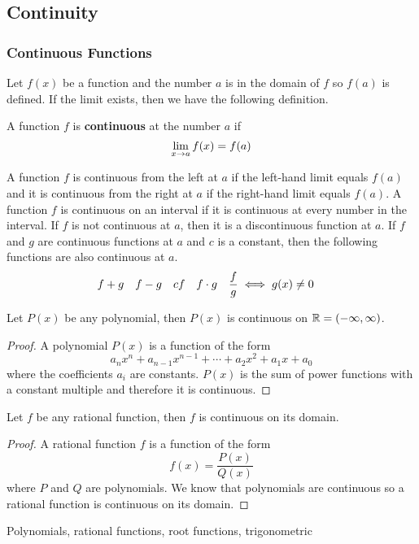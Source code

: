 \subsection{Continuity}
\subsubsection{Continuous Functions}
Let \(f(x)\) be a function and the number \(a\) is in the domain of \(f\) so
\(f(a)\) is defined.
If the limit exists, then we have the following definition.
\begin{definition}
    A function \(f\) is \textbf{continuous} at the number \(a\) if
    \[\lim_{x\to a}f(x)=f(a) \qedhere\]
\end{definition}
A function \(f\) is continuous from the left at \(a\) if the left-hand limit
equals \(f(a)\) and it is continuous from the right at \(a\) if the right-hand
limit equals \(f(a)\).
A function \(f\) is continuous on an interval if it is continuous
at every number in the interval.
If \(f\) is not continuous at \(a\),
then it is a discontinuous function at \(a\).
If \(f\) and \(g\) are continuous functions at \(a\) and \(c\) is a constant,
then the following functions are also continuous at \(a\).
    \begin{align*}
        &f+g&f-g&&cf&&f\cdot g&&\dfrac{f}{g}\iff g(x)\neq 0& \qedhere
    \end{align*}
\begin{theorem}
    Let \(P(x)\) be any polynomial, then \(P(x)\) is continuous on
    \(\mathbb{R}=(-\infty,\infty)\).
\end{theorem}
\begin{proof}
    A polynomial \(P(x)\) is a function of the form
    \[a_nx^n+a_{n-1}x^{n-1}+\dotsb +a_{2}x^{2}+a_1x+a_0\]
    where the coefficients \(a_i\) are constants.
    \(P(x)\) is the sum of power functions with a constant multiple and
    therefore it is continuous.
\end{proof}
\begin{theorem}
    Let \(f\) be any rational function,
    then \(f\) is continuous on its domain.
\end{theorem}
\begin{proof}
    A rational function \(f\) is a function of the form
    \[f(x)=\frac{P(x)}{Q(x)}\] where \(P\) and \(Q\) are polynomials.
    We know that polynomials are continuous so a rational function is
    continuous on its domain.
\end{proof}
Polynomials, rational functions, root functions, trigonometric
